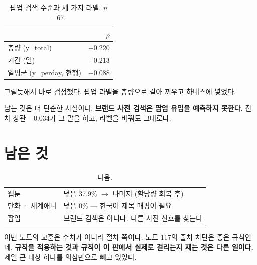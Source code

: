 \documentclass[10pt]{article}
\begin{document}
\begin{table}[t]
\centering\tsize
\caption{팝업 검색 수준과 세 가지 라벨. $n$=67.}
\begin{tabular}{lr}
\toprule
& $\rho$ \\
\midrule
총량 (y\_total) & $+$0.220 \\
기간 (일) & $+$0.213 \\
일평균 (y\_perday, 현행) & $+$0.088 \\
\bottomrule
\end{tabular}
\end{table}

그럴듯해서 바로 검정했다. 팝업 라벨을 총량으로 갈아 끼우고 하네스에 넣었다.


남는 것은 더 단순한 사실이다. \textbf{브랜드 사전 검색은 팝업 유입을
예측하지 못한다.} 잔차 상관 $-$0.034가 그 말을 하고, 라벨을 바꿔도 그대로다.

\section{남은 것}

\begin{table}[t]
\centering\tsize
\caption{다음.}
\begin{tabular}{ll}
\toprule
웹툰 & 덮음 37.9\% $\to$ 나머지 (할당량 회복 후) \\
만화 · 세계애니 & 덮음 0\% --- 한국어 제목 매핑이 필요 \\
팝업 & 브랜드 검색은 아니다. 다른 사전 신호를 찾는다 \\
\bottomrule
\end{tabular}
\end{table}

이번 노트의 교훈은 수치가 아니라 절차 쪽이다. 노트 117의 출처 차단은
좋은 규칙인데, \textbf{규칙을 적용하는 것과 규칙이 이 판에서 실제로
걸리는지 재는 것은 다른 일이다.} 제일 큰 대상 하나를 의심만으로 빼고
있었다.
\end{document}
